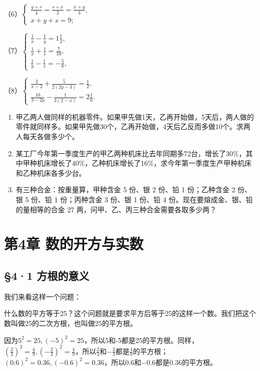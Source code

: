 （6）\(\left\{ \begin{array}{l} \frac{y + s}{4} = \frac{s + x}{2} = \frac{x + y}{3}, \\ x + y + s = 9; \end{array} \right.\)

（7）\(\left\{ \begin{array}{l} \frac{1}{x} - \frac{1}{y} = 1\frac{1}{2}, \\ \frac{1}{x} + \frac{1}{s} = \frac{7}{10}, \\ \frac{1}{y} - \frac{1}{s} = -\frac{5}{6}, \end{array} \right.\)

（8）\(\left\{ \begin{array}{l} \frac{2}{x - 2} + \frac{5}{2(2y - 3)} = \frac{1}{2}, \\ \frac{10}{3 - 2y} - \frac{1}{3(2 - x)} = 2\frac{1}{6}. \end{array} \right.\)

\begin{enumerate}[start=3]
\item
  甲乙两人做同样的机器零件。如果甲先做1天，乙再开始做，5天后，两人做的零件就同样多。如果甲先做30个，乙再开始做，4天后乙反而多做10个。求两人每天各做多少个。
\item
  某工厂今年第一季度生产的甲乙两种机床比去年同期多72台，增长了30\%，其中甲种机床增长了40\%，乙种机床增长了16\%，求今年第一季度生产甲种机床和乙种机床各多少台。
\item
  有三种合金：按重量算，甲种含金 5 份、银 2 份、铅 1 份；乙种含金 2
  份、银 5 份、铅 1 份；丙种含金 3 份、银 1 份、铅 4
  份。现在要熔成金、银、铅的量相等的合金 27
  两，问甲、乙、丙三种合金需要各取多少两？
\end{enumerate}

\chapter{第4章 数的开方与实数}

\section{§4·1 方根的意义}

我们来看这样一个问题：

什么数的平方等于25？这个问题就是要求平方后等于25的这样一个数。我们把这个数叫做25的二次方根，也叫做25的平方根。

因为\(5^{2} = 25, (-5)^{2} = 25\)，所以5和-5都是25的平方根。同样，\(\left(\frac{2}{3}\right)^{2} = \frac{4}{9}, \left(-\frac{2}{3}\right)^{2} = \frac{4}{9}\)，所以\(\frac{2}{3}\)和\(-\frac{2}{3}\)都是\(\frac{4}{9}\)的平方根；\((0.6)^{2} = 0.36, (-0.6)^{2} = 0.36\)，所以\(0.6\)和\(-0.6\)都是\(0.36\)的平方根。

